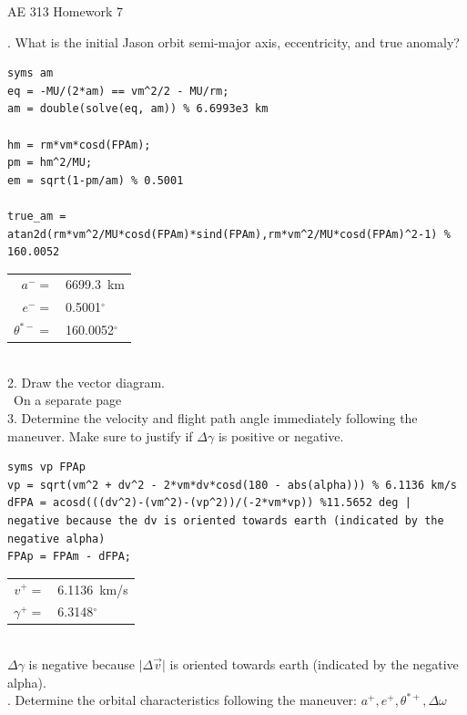 \documentclass[hidelinks,12pt]{article}
\begin{document}

\begin{center}
\large AE 313 Homework 7
\end{center}
. What is the initial Jason orbit semi-major axis, eccentricity, and true anomaly?\\
\begin{lstlisting}[frame=lines,style=Matlab-editor,basicstyle = \mlttfamily]
syms am
eq = -MU/(2*am) == vm^2/2 - MU/rm;
am = double(solve(eq, am)) % 6.6993e3 km

hm = rm*vm*cosd(FPAm);
pm = hm^2/MU;
em = sqrt(1-pm/am) % 0.5001

true_am = atan2d(rm*vm^2/MU*cosd(FPAm)*sind(FPAm),rm*vm^2/MU*cosd(FPAm)^2-1) % 160.0052
\end{lstlisting}
\begin{tabular}{rl}
  $a^-=$&6699.3~km\\
  $e^-=$&0.5001$^\circ$\\
  $\theta^{*-}=$&160.0052$^\circ$
\end{tabular}\\
\vspace{10px}
2. Draw the vector diagram.\\
~On a separate page\\
\vspace{10px}
3. Determine the velocity and flight path angle immediately following the
maneuver. Make sure to justify if $\Delta \gamma$ is positive or negative.\\
\begin{lstlisting}[frame=lines,style=Matlab-editor,basicstyle = \mlttfamily]
syms vp FPAp
vp = sqrt(vm^2 + dv^2 - 2*vm*dv*cosd(180 - abs(alpha))) % 6.1136 km/s
dFPA = acosd(((dv^2)-(vm^2)-(vp^2))/(-2*vm*vp)) %11.5652 deg | negative because the dv is oriented towards earth (indicated by the negative alpha)
FPAp = FPAm - dFPA;
\end{lstlisting}
\begin{tabular}{rl}
  $v^+=$&6.1136~km/s\\
  $\gamma^+=$&6.3148$^\circ$\\
\end{tabular}\\
$\Delta \gamma$ is negative because $\lvert \Delta \vec{v} \rvert$ is oriented towards earth (indicated by the negative alpha).\\
. Determine the orbital characteristics following the maneuver: $a^+, e^+, \theta^{*+}, \Delta \omega$\\
\end{document}
